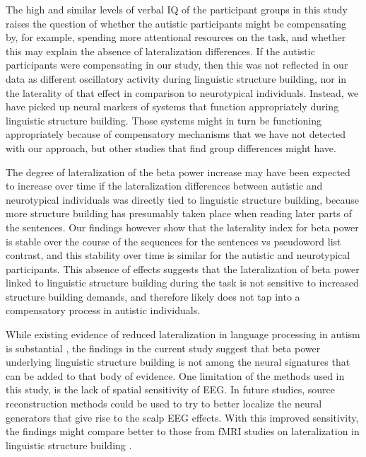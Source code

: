 The high and similar levels of verbal IQ of the participant groups in this study raises the question of whether the autistic participants might be compensating by, for example, spending more attentional resources on the task, and whether this may explain the absence of lateralization differences. If the autistic participants were compensating in our study, then this was not reflected in our data as different oscillatory activity during linguistic structure building, nor in the laterality of that effect in comparison to neurotypical individuals. Instead, we have picked up neural markers of systems that function appropriately during linguistic structure building. Those systems might in turn be functioning appropriately because of compensatory mechanisms that we have not detected with our approach, but other studies that find group differences might have.

The degree of lateralization of the beta power increase may have been expected to increase over time if the lateralization differences between autistic and neurotypical individuals was directly tied to linguistic structure building, because more structure building has presumably taken place when reading later parts of the sentences. Our findings however show that the laterality index for beta power is stable over the course of the sequences for the sentences vs pseudoword list contrast, and this stability over time is similar for the autistic and neurotypical participants. This absence of effects suggests that the lateralization of beta power linked to linguistic structure building during the task is not sensitive to increased structure building demands, and therefore likely does not tap into a compensatory process in autistic individuals. 

While existing evidence of reduced lateralization in language processing in autism is substantial \citep{lindell2013}, the findings in the current study suggest that beta power underlying linguistic structure building is not among the neural signatures that can be added to that body of evidence. One limitation of the methods used in this study, is the lack of spatial sensitivity of EEG. In future studies, source reconstruction methods could be used to try to better localize the neural generators that give rise to the scalp EEG effects. With this improved sensitivity, the findings might compare better to those from fMRI studies on lateralization in linguistic structure building \citep{jouravlev2020}.

